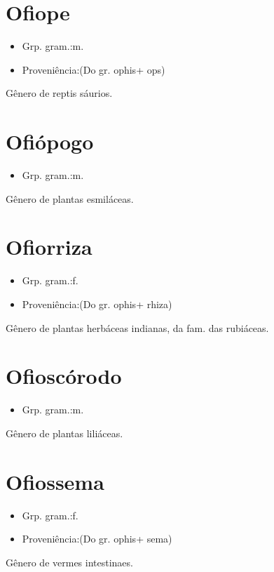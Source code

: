 \section{Ofiope}
\begin{itemize}
\item {Grp. gram.:m.}
\end{itemize}
\begin{itemize}
\item {Proveniência:(Do gr. \textunderscore ophis\textunderscore  + \textunderscore ops\textunderscore )}
\end{itemize}
Gênero de reptis sáurios.
\section{Ofiópogo}
\begin{itemize}
\item {Grp. gram.:m.}
\end{itemize}
Gênero de plantas esmiláceas.
\section{Ofiorriza}
\begin{itemize}
\item {Grp. gram.:f.}
\end{itemize}
\begin{itemize}
\item {Proveniência:(Do gr. \textunderscore ophis\textunderscore  + \textunderscore rhiza\textunderscore )}
\end{itemize}
Gênero de plantas herbáceas indianas, da fam. das rubiáceas.
\section{Ofioscórodo}
\begin{itemize}
\item {Grp. gram.:m.}
\end{itemize}
Gênero de plantas liliáceas.
\section{Ofiossema}
\begin{itemize}
\item {Grp. gram.:f.}
\end{itemize}
\begin{itemize}
\item {Proveniência:(Do gr. \textunderscore ophis\textunderscore  + \textunderscore sema\textunderscore )}
\end{itemize}
Gênero de vermes intestinaes.
